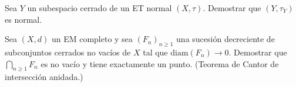 \documentclass{article}
\theoremstyle{definition}
\newenvironment{ejercicio}[1]{\begin{trivlist}
\item[\hskip \labelsep {\bfseries Ejercicio}\hskip \labelsep {\bfseries #1.}]}{\end{trivlist}}
\begin{document}
\begin{ejercicio}{C2}
    Sea \(Y\) un subespacio cerrado de un ET normal \((X, \tau)\). Demostrar que \((Y, \tau_Y)\) es normal.
\end{ejercicio}

\begin{ejercicio}{C3}
    Sea \((X, d)\) un EM completo y sea \({(F_n)}_{n \geq 1}\) una sucesión decreciente de subconjuntos cerrados no vacíos de \(X\) tal que \(\mathrm{diam}(F_n) \to 0\). Demostrar que \(\bigcap_{n \geq 1} F_n\) es no vacío y tiene exactamente un punto. (Teorema de Cantor de intersección anidada.)
\end{ejercicio}
\end{document}

